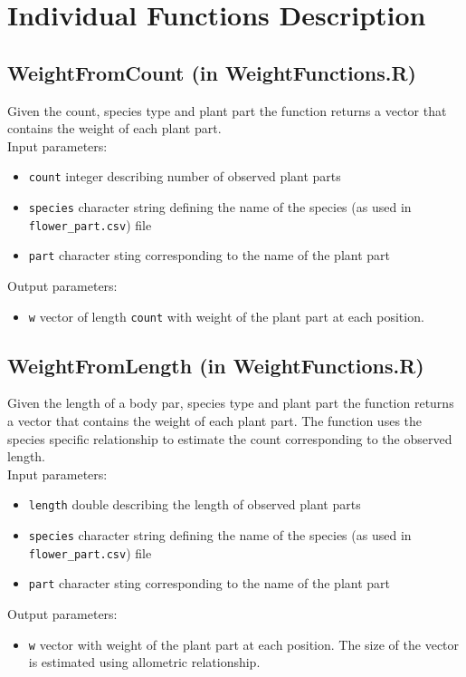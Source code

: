 \documentclass[10pt]{book} %
\begin{document}
\newpage
%
%
%
%
\section{Individual Functions Description}
\subsection*{WeightFromCount (in WeightFunctions.R)}
Given the count, species type and plant part the function returns a vector that contains the weight of each plant part. \\
Input parameters:
\begin{itemize}
\item \texttt{count}  integer describing number of observed plant parts
\item \texttt{species} character string defining the name of the species (as used in \texttt{flower\_part.csv}) file
\item \texttt{part} character sting corresponding to the name of the plant part
\end{itemize}
Output parameters:
\begin{itemize}
\item \texttt{w}  vector of length \texttt{count} with weight of the plant part at each position.
\end{itemize}

\subsection*{WeightFromLength (in WeightFunctions.R)}
Given the length of a body par, species type and plant part the function returns a vector that contains the weight of each plant part. The function uses the species specific relationship to estimate the count corresponding to the observed length. \\
Input parameters:
\begin{itemize}
\item \texttt{length}  double describing the length of observed plant parts
\item \texttt{species} character string defining the name of the species (as used in \texttt{flower\_part.csv}) file
\item \texttt{part} character sting corresponding to the name of the plant part
\end{itemize}
Output parameters:
\begin{itemize}
\item \texttt{w}  vector with weight of the plant part at each position. The size of the vector is estimated using allometric relationship.
\end{itemize}
\end{document}
